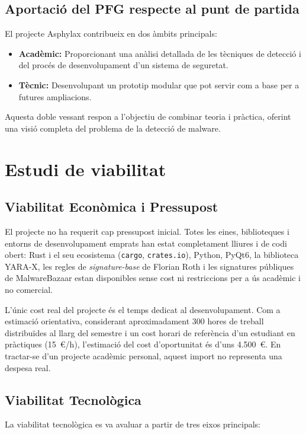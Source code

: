 \documentclass[12pt,a4paper]{report}
\begin{document}
\section{Aportació del PFG respecte al punt de partida}
El projecte Asphylax contribueix en dos àmbits principals:
\begin{itemize}
    \item \textbf{Acadèmic:} Proporcionant una anàlisi detallada de les tècniques de detecció i del procés de desenvolupament d'un sistema de seguretat.
    \item \textbf{Tècnic:} Desenvolupant un prototip modular que pot servir com a base per a futures ampliacions.
\end{itemize}
Aquesta doble vessant respon a l'objectiu de combinar teoria i pràctica, oferint una visió completa del problema de la detecció de malware.


\chapter{Estudi de viabilitat}
\label{ch:viabilitat}

\section{Viabilitat Econòmica i Pressupost}
El projecte no ha requerit cap pressupost inicial. Totes les eines, biblioteques i entorns de desenvolupament emprats han estat completament lliures i de codi obert: Rust i el seu ecosistema (\texttt{cargo}, \texttt{crates.io}), Python, PyQt6, la biblioteca YARA-X, les regles de \textit{signature-base} de Florian Roth i les signatures públiques de MalwareBazaar estan disponibles sense cost ni restriccions per a ús acadèmic i no comercial.

L'únic cost real del projecte és el temps dedicat al desenvolupament. Com a estimació orientativa, considerant aproximadament 300 hores de treball distribuïdes al llarg del semestre i un cost horari de referència d'un estudiant en pràctiques (15~\euro/h), l'estimació del cost d'oportunitat és d'uns 4.500~\euro. En tractar-se d'un projecte acadèmic personal, aquest import no representa una despesa real.

\section{Viabilitat Tecnològica}
La viabilitat tecnològica es va avaluar a partir de tres eixos principals:
\end{document}
